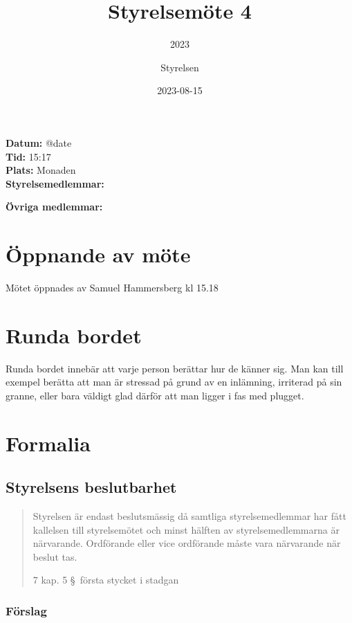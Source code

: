 \documentclass[protokoll]{dvd}
\begin{document}
\title{Styrelsemöte 4}
\subtitle{2023}
\author{Styrelsen}
\date{2023-08-15}

\textbf{Datum:} \csname @date\endcsname\\
\textbf{Tid:} 15:17\\
\textbf{Plats:} Monaden\\
\textbf{Styrelsemedlemmar:}
\begin{närvarande_förtroendevalda}
\end{närvarande_förtroendevalda}

\textbf{Övriga medlemmar:} \\


\section{Öppnande av möte}

Mötet öppnades av Samuel Hammersberg kl 15.18

\section{Runda bordet}

Runda bordet innebär att varje person berättar hur de känner sig.
Man kan till exempel berätta att man är stressad på grund av en inlämning, irriterad på sin granne, eller bara väldigt glad därför att man ligger i fas med plugget.

\section{Formalia}

\subsection{Styrelsens beslutbarhet}

\blockquote[7 kap. 5 \S~första stycket i stadgan][]{%
    Styrelsen är endast beslutsmässig då samtliga styrelsemedlemmar har fått kallelsen till styrelsemötet och minst hälften av styrelsemedlemmarna är närvarande.
    Ordförande eller vice ordförande måste vara närvarande när beslut tas.
}

\subsubsection*{Förslag}
\end{document}
